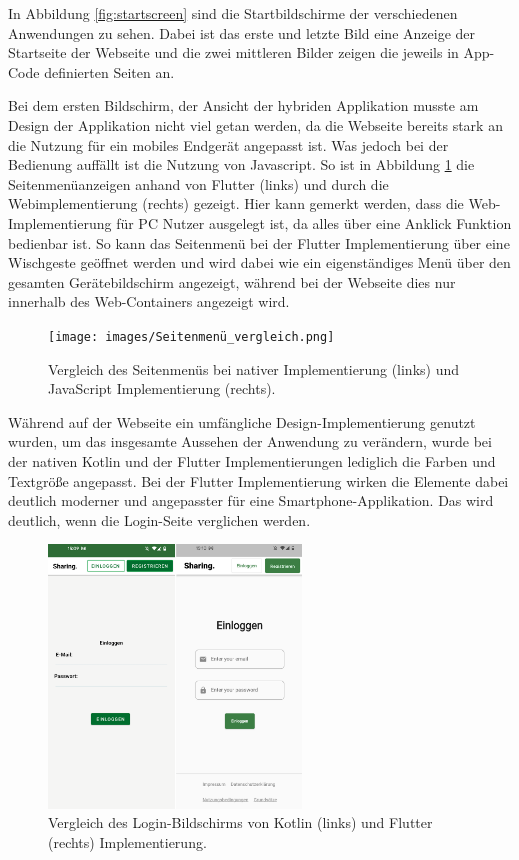 In Abbildung \ref{fig:startscreen} sind die Startbildschirme der verschiedenen Anwendungen zu sehen. Dabei ist das erste und letzte Bild eine Anzeige der Startseite der Webseite und die zwei mittleren Bilder zeigen die jeweils in App-Code definierten Seiten an.

Bei dem ersten Bildschirm, der Ansicht der hybriden Applikation musste am Design der Applikation nicht viel getan werden, da die Webseite bereits stark an die Nutzung für ein mobiles Endgerät angepasst ist. Was jedoch bei der Bedienung auffällt ist die Nutzung von Javascript.
So ist in Abbildung \ref{fig:sidemenu} die Seitenmenüanzeigen anhand von Flutter (links) und durch die Webimplementierung (rechts) gezeigt. Hier kann gemerkt werden, dass die Web-Implementierung für PC Nutzer ausgelegt ist, da alles über eine Anklick Funktion bedienbar ist. So kann das Seitenmenü bei der Flutter Implementierung über eine Wischgeste geöffnet werden und wird dabei wie ein eigenständiges Menü über den gesamten Gerätebildschirm angezeigt, während bei der Webseite dies nur innerhalb des Web-Containers angezeigt wird.
\begin{figure}[ht]
  \centering
  \texttt{[image: images/Seitenmenü\_vergleich.png]} 
  \caption[Vergleich des Seitenmenüs der nativen und hybriden Applikation]{Vergleich des Seitenmenüs bei nativer Implementierung (links) und JavaScript Implementierung (rechts).}
  \label{fig:sidemenu}
\end{figure}

Während auf der Webseite ein umfängliche Design-Implementierung genutzt wurden, um das insgesamte Aussehen der Anwendung zu verändern, wurde bei der nativen Kotlin und der Flutter Implementierungen lediglich die Farben und Textgröße angepasst. Bei der Flutter Implementierung wirken die Elemente dabei deutlich moderner und angepasster für eine Smartphone-Applikation. Das wird deutlich, wenn die Login-Seite verglichen werden.

\begin{figure}[ht]
  \centering
  \includegraphics[height=7cm,keepaspectratio]{images/Login_vergleich.png} 
  \caption[Vergleich des Login-Bildschirms von Kotlin und Flutter Implementierung.]{Vergleich des Login-Bildschirms von Kotlin (links) und Flutter (rechts) Implementierung.}
  \label{fig:loginscreen}
\end{figure}

